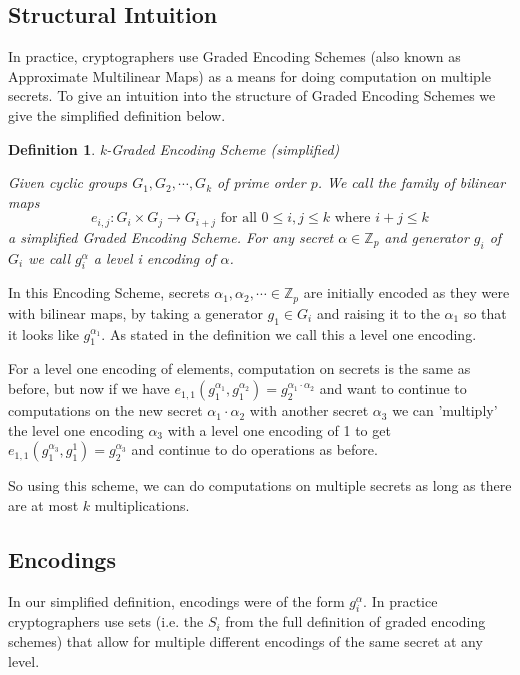\documentclass[12pt,twoside]{reedthesis}
\newtheorem{definition}{Definition}
\newcommand{\Z}[0]{\mathbb{Z}}
\begin{document}
    \subsection{Structural Intuition}
    
    In practice, cryptographers use Graded Encoding Schemes (also known as Approximate Multilinear Maps) as a means for doing computation on multiple secrets. To give an intuition into the structure of Graded Encoding Schemes we give the simplified definition below.
    
    \begin{definition}{k-Graded Encoding Scheme (simplified)} 
    
    \par Given cyclic groups $G_1,G_2, \cdots , G_k$ of prime order $p$. We call the family of bilinear maps $$e_{i,j}:G_i \times G_j \rightarrow G_{i+j} \text{ for all } 0 \leq i,j \leq k \text{ where } i+j \leq k$$
    a simplified Graded Encoding Scheme. For any secret $\alpha \in \Z_p$ and generator $g_i$ of $G_i$ we call $g_i^\alpha$ a level i encoding of $\alpha$. 
    \end{definition}
    
    In this Encoding Scheme, secrets $\alpha_1,\alpha_2, \cdots \in \Z_p$ are initially encoded as they were with bilinear maps, by taking a generator $g_1\in G_i$ and raising it to the $\alpha_1$ so that it looks like $g_1^{\alpha_1}$. As stated in the definition we call this a level one encoding.
    \par For a level one encoding of elements, computation on secrets is the same as before, but now if we have $e_{1,1}(g_1^{\alpha_1},g_1^{\alpha_2})=g_2^{\alpha_1\cdot \alpha_2}$ and want to continue to computations on the new secret $\alpha_1 \cdot \alpha_2$ with another secret $\alpha_3$ we can 'multiply' the level one encoding $\alpha_3$ with a level one encoding of 1 to get $e_{1,1}(g_1^{\alpha_3},g_1^1) = g_2^{\alpha_3}$ and continue to do operations as before.
    \par So using this scheme, we can do computations on multiple secrets as long as there are at most $k$ multiplications.
    
    \subsection{Encodings}
    
    In our simplified definition, encodings were of the form $g_i^\alpha$. In practice cryptographers use sets (i.e. the $S_{i}$ from the full definition of graded encoding schemes) that allow for multiple different encodings of the same secret at any level. 
       
\end{document}
